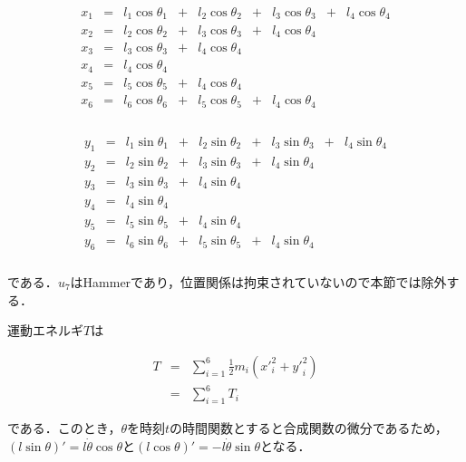 \begin{eqnarray}
    \begin{matrix}
        x_1 &=& l_1 \cos \theta_1 &+& l_2 \cos \theta_2 &+& l_3 \cos \theta_3 &+& l_4 \cos \theta_4\\
        x_2 &=& l_2 \cos \theta_2 &+& l_3 \cos \theta_3 &+& l_4 \cos \theta_4 & & \\
        x_3 &=& l_3 \cos \theta_3 &+& l_4 \cos \theta_4 & & & &\\
        x_4 &=& l_4 \cos \theta_4 & & & & & &\\
        x_5 &=& l_5 \cos \theta_5 &+& l_4 \cos \theta_4 & & & &\\
        x_6 &=& l_6 \cos \theta_6 &+& l_5 \cos \theta_5 &+& l_4 \cos \theta_4 & &\\
    \end{matrix}
\end{eqnarray}

\begin{eqnarray}
    \begin{matrix}
        y_1 &=& l_1 \sin \theta_1 &+& l_2 \sin \theta_2 &+& l_3 \sin \theta_3 &+& l_4 \sin \theta_4\\
        y_2 &=& l_2 \sin \theta_2 &+& l_3 \sin \theta_3 &+& l_4 \sin \theta_4 & & \\
        y_3 &=& l_3 \sin \theta_3 &+& l_4 \sin \theta_4 & & & &\\
        y_4 &=& l_4 \sin \theta_4 & & & & & &\\
        y_5 &=& l_5 \sin \theta_5 &+& l_4 \sin \theta_4 & & & &\\
        y_6 &=& l_6 \sin \theta_6 &+& l_5 \sin \theta_5 &+& l_4 \sin \theta_4 & & \\
    \end{matrix}
\end{eqnarray}

である．$u_7$はHammerであり，位置関係は拘束されていないので本節では除外する．

運動エネルギ$T$は

\begin{eqnarray}
    \label{math:lagrange-T}
    T &=& \sum_{i = 1}^{6} \frac{1}{2} m_i({x'}_i^2 + {y'}_i^2) \nonumber \\
      &=& \sum_{i = 1}^{6} T_i
\end{eqnarray}

である．このとき，$\theta$を時刻$t$の時間関数とすると合成関数の微分であるため，$(l\sin \theta)' = l \dot{\theta} \cos \theta$と$(l\cos \theta)' = -l \dot{\theta} \sin \theta$となる．

